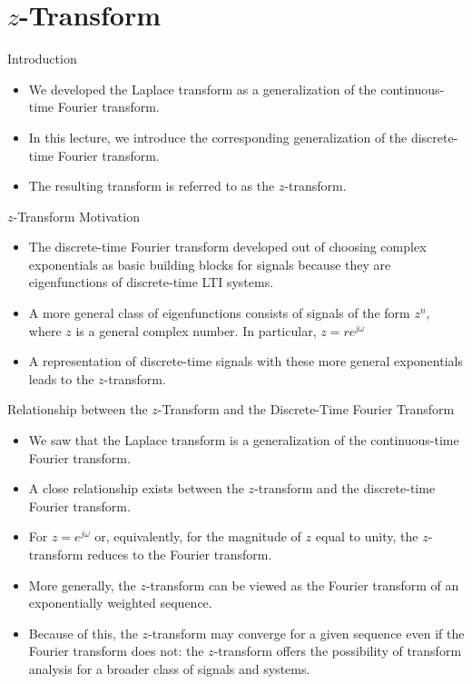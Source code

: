 \section{$z$-Transform}
\begin{frame}{Introduction}
    \begin{itemize}
        \item We developed the Laplace transform as a generalization of the continuous-time Fourier transform.
        \item In this lecture, we introduce the corresponding generalization of the discrete-time Fourier transform.
        \item The resulting transform is referred to as the $z$-transform.
    \end{itemize}
\end{frame}


\begin{frame}{$z$-Transform Motivation}
    \begin{itemize}
        \item The discrete-time Fourier transform developed out of choosing complex exponentials as basic building blocks for signals because they are eigenfunctions of discrete-time LTI systems.
        \item A more general class of eigenfunctions consists of signals of the form $z^n$, where $z$ is a general complex number. In particular, $z = re^{j\omega}$
        \item A representation of discrete-time signals with these more general exponentials leads to the $z$-transform.
    \end{itemize}
\end{frame}

\begin{frame}{Relationship between the $z$-Transform and the Discrete-Time Fourier Transform}
    \begin{itemize}
        \item We saw that the Laplace transform is a generalization of the continuous-time Fourier transform.
        \item A close relationship exists between the $z$-transform and the discrete-time Fourier transform.
        \item For $z = e^{j\omega}$ or, equivalently, for the magnitude of $z$ equal to unity, the $z$-transform reduces to the Fourier transform.
        \item More generally, the $z$-transform can be viewed as the Fourier transform of an exponentially weighted sequence.
        \item Because of this, the $z$-transform may converge for a given sequence even if the Fourier transform does not: the $z$-transform offers the possibility of transform analysis for a broader class of signals and systems.
    \end{itemize}
\end{frame}

